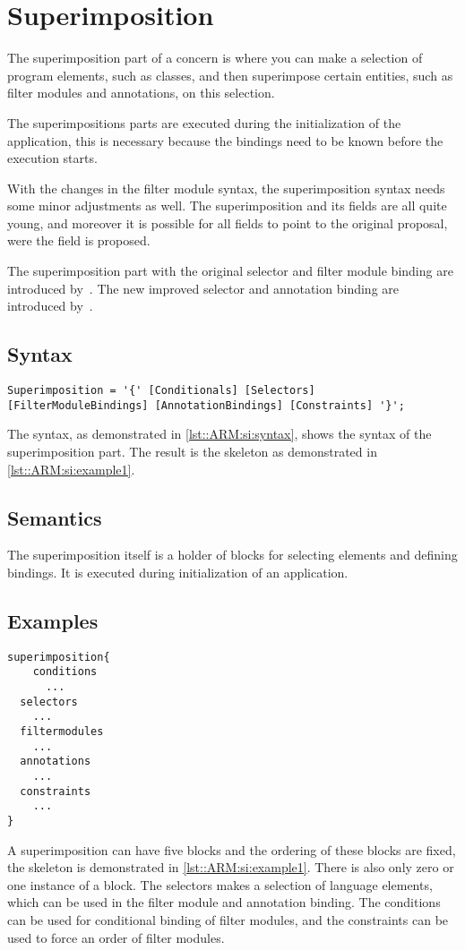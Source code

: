 \chapter{Superimposition} \label{chapter:superimposition}
The superimposition part of a concern is where you can make a selection of program elements, such as classes, and then superimpose certain entities, such as filter modules and annotations, on this selection.

The superimpositions parts are executed during the initialization of the application, this is necessary because the bindings need to be known before the execution starts.

With the changes in the filter module syntax, the superimposition syntax needs some minor adjustments as well.
The superimposition and its fields are all quite young, and moreover it is possible for all fields to point to the original proposal, were the field is proposed.

The superimposition part with the original selector and filter module binding are introduced by~\cite{salinas:ms01}. 
The new improved selector and annotation binding are introduced by~\cite{Havinga2005}.

\section{Syntax}
\begin{lstlisting}[caption = {Superimposition syntax}, label = lst::ARM:si:syntax, style = listing, language = ebnf, float = tpb]
Superimposition = '{' [Conditionals] [Selectors] [FilterModuleBindings] [AnnotationBindings] [Constraints] '}';
\end{lstlisting}
The syntax, as demonstrated in \autoref{lst::ARM:si:syntax}, shows the syntax of the superimposition part. 
The result is the skeleton as demonstrated in \autoref{lst::ARM:si:example1}.

\section{Semantics}
The superimposition itself is a holder of blocks for selecting elements and defining bindings. 
It is executed during initialization of an application.

\section{Examples}
\begin{lstlisting}[caption={The superimposition skeleton}, label = lst::ARM:si:example1,
style=listing, language =ComposeStar, float = tpb]
superimposition{
	conditions
	  ...
  selectors
    ...
  filtermodules
    ...
  annotations
    ...
  constraints
    ...
}
\end{lstlisting}
A superimposition can have five blocks and the ordering of these blocks are fixed, the skeleton is demonstrated in \autoref{lst::ARM:si:example1}. 
There is also only zero or one instance of a block. 
The selectors makes a selection of language elements, which can be used in the filter module and annotation binding.
The conditions can be used for conditional binding of filter modules, and the constraints can be used to force an order of filter modules.

